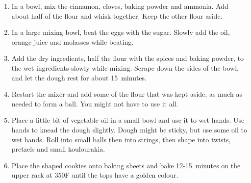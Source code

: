 \begin{enumerate}
    \item In a bowl, mix the cinnamon, cloves, baking powder and ammonia. Add about half of the flour and whisk together. Keep the other flour aside.
    \item In a large mixing bowl, beat the eggs with the sugar. Slowly add the oil, orange juice and molasses while beating.
    \item Add the dry ingredients, half the flour with the spices and baking powder, to the wet ingredients slowly while mixing. Scrape down the sides of the bowl, and let the dough rest for about 15~minutes.
    \item Restart the mixer and add some of the flour that was kept aside, as much as needed to form a ball. You might not have to use it all.
    \item Place a little bit of vegetable oil in a small bowl and use it to wet hands. Use hands to knead the dough slightly. Dough might be sticky, but use some oil to wet hands. Roll into small balls then into strings, then shape into twists, pretzels and small koulourakia.
    \item Place the shaped cookies onto baking sheets and bake 12-15~minutes on the upper rack at 350\degree F until the tops have a golden colour.
\end{enumerate}
